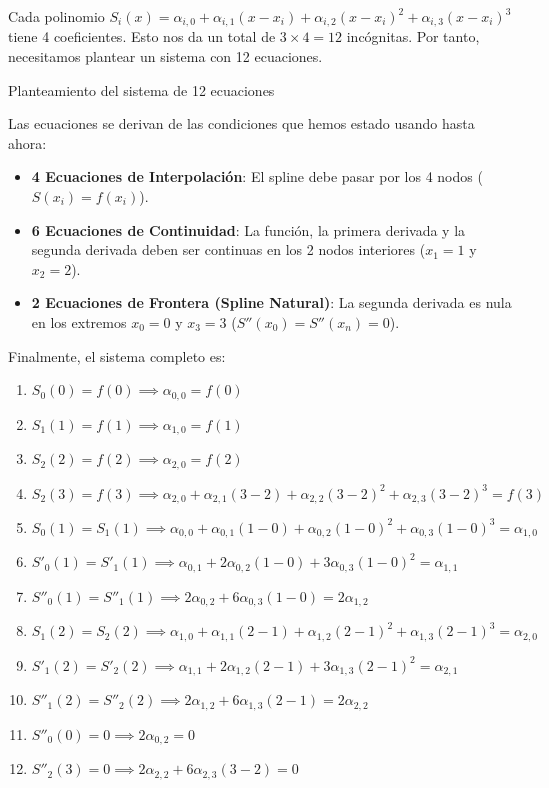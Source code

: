 \documentclass{article}
\begin{document}
Cada polinomio $S_i(x) = \alpha_{i,0} + \alpha_{i,1}(x-x_i) + \alpha_{i,2}(x-x_i)^2 + \alpha_{i,3}(x-x_i)^3$ tiene 4 coeficientes. Esto nos da un total de $3 \times 4 = 12$ incógnitas. Por tanto, necesitamos plantear un sistema con 12 ecuaciones.

Planteamiento del sistema de 12 ecuaciones

Las ecuaciones se derivan de las condiciones que hemos estado usando hasta ahora:
\begin{itemize}
    \item \textbf{4 Ecuaciones de Interpolación}: El spline debe pasar por los 4 nodos ($S(x_i)=f(x_i)$).
    \item \textbf{6 Ecuaciones de Continuidad}: La función, la primera derivada y la segunda derivada deben ser continuas en los 2 nodos interiores ($x_1=1$ y $x_2=2$).
    \item \textbf{2 Ecuaciones de Frontera (Spline Natural)}: La segunda derivada es nula en los extremos $x_0=0$ y $x_3=3$ ($S''(x_0)=S''(x_n)=0$).
\end{itemize}

Finalmente, el sistema completo es:

\begin{enumerate}
    \item $S_0(0) = f(0) \implies \alpha_{0,0} = f(0)$
    \item $S_1(1) = f(1) \implies \alpha_{1,0} = f(1)$
    \item $S_2(2) = f(2) \implies \alpha_{2,0} = f(2)$
    \item $S_2(3) = f(3) \implies \alpha_{2,0} + \alpha_{2,1}(3-2) + \alpha_{2,2}(3-2)^2 + \alpha_{2,3}(3-2)^3 = f(3)$
    \item $S_0(1) = S_1(1) \implies \alpha_{0,0} + \alpha_{0,1}(1-0) + \alpha_{0,2}(1-0)^2 + \alpha_{0,3}(1-0)^3 = \alpha_{1,0}$
    \item $S'_0(1) = S'_1(1) \implies \alpha_{0,1} + 2\alpha_{0,2}(1-0) + 3\alpha_{0,3}(1-0)^2 = \alpha_{1,1}$
    \item $S''_0(1) = S''_1(1) \implies 2\alpha_{0,2} + 6\alpha_{0,3}(1-0) = 2\alpha_{1,2}$
    \item $S_1(2) = S_2(2) \implies \alpha_{1,0} + \alpha_{1,1}(2-1) + \alpha_{1,2}(2-1)^2 + \alpha_{1,3}(2-1)^3 = \alpha_{2,0}$
    \item $S'_1(2) = S'_2(2) \implies \alpha_{1,1} + 2\alpha_{1,2}(2-1) + 3\alpha_{1,3}(2-1)^2 = \alpha_{2,1}$
    \item $S''_1(2) = S''_2(2) \implies 2\alpha_{1,2} + 6\alpha_{1,3}(2-1) = 2\alpha_{2,2}$
    \item $S''_0(0) = 0 \implies 2\alpha_{0,2} = 0$
    \item $S''_2(3) = 0 \implies 2\alpha_{2,2} + 6\alpha_{2,3}(3-2) = 0$
\end{enumerate}
\end{document}
